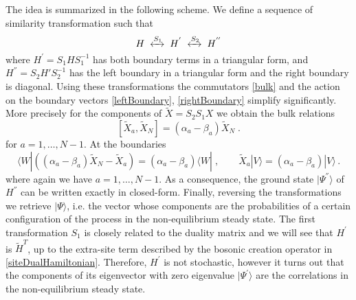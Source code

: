 \documentclass[10pt]{article}
\numberwithin{equation}{section}
\numberwithin{equation}{subsection}
\newcommand{\Xt}{\widetilde{X}}
\newcommand{\co}{\;,}
\newcommand{\dt}{\;.}
\begin{document}
 The idea is summarized in the following scheme. 
 We define a sequence of similarity transformation such that 
 \begin{equation}
 	H\;\xleftrightarrow{S_{1}}\;H^{'}\;\xleftrightarrow{S_{2}}\;H^{''}
 \end{equation} 
 where $H^{'}= S_{1} H S_{1}^{-1} $ has both boundary terms in a triangular form, and $H^{''} = S_{2}H' S_{2}^{-1}$ has the left boundary in a triangular form and the right boundary is diagonal. Using these transformations the commutators \eqref{bulk} and the action on the boundary vectors \eqref{leftBoundary}, \eqref{rightBoundary} simplify significantly. More precisely for the components of $\tilde X=S_2S_1 X$ we obtain the bulk relations
\begin{equation}\label{commutationsBula2}
	\left[\Xt_{a},\Xt_{N}\right]=(\alpha_{a}-\beta_{a})\Xt_{N}\dt %
\end{equation}
for $a=1,\ldots,N-1$. 
At the boundaries 
\begin{equation}\label{commLEFT2}
	\langle W|\left((\alpha_{a}-\beta_{a})\Xt_{N}-\Xt_{a}\right)=(\alpha_{a}-\beta_{a})\langle W|%
	\co \qquad 
	\Xt_{a} |V\rangle= (\alpha_{a}-\beta_{a})|V\rangle%
	\,.
\end{equation} 
where again we have  $a=1,\ldots,N-1$.   As a consequence, the ground state $|\Psi^{''}\rangle$ of $H^{''}$ can be written exactly in closed-form. Finally, reversing the transformations we retrieve $|\Psi\rangle$, i.e. the vector whose components are the probabilities of a certain configuration of the process in the non-equilibrium steady state.
 The first transformation $S_{1}$ is closely related to the duality matrix and we will see that $H^{'}$ is $\widetilde{H}^{T}$, up to the extra-site term described by the bosonic creation operator in \eqref{siteDualHamiltonian}. Therefore, $H^{'}$ is not stochastic, however it turns out that the components of its eigenvector with zero eigenvalue $|\Psi^{'}\rangle$ are the correlations in the non-equilibrium steady state. 
\end{document}
